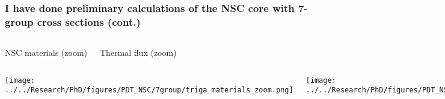 \documentclass[compress,10pt]{beamer}
\begin{document}
\begin{frame}
    \frametitle{I have done preliminary calculations of the NSC core with 7-group cross sections (cont.)}

    \centering
    \begin{columns}[c]


        \centering
        {\small NSC materials (zoom)}


        \centering
        {\small Thermal flux (zoom)}

    \end{columns}

    \begin{columns}[c]


        \centering
        {}\texttt{[image: ../../Research/PhD/figures/PDT\_NSC/7group/triga\_materials\_zoom.png]} \\


        \centering
        {}\texttt{[image: ../../Research/PhD/figures/PDT\_NSC/7group/triga\_log\_zoom\_g5.png]} \\

    \end{columns}

\end{frame}


\typeout{***********************************************************************************}
\end{document}
